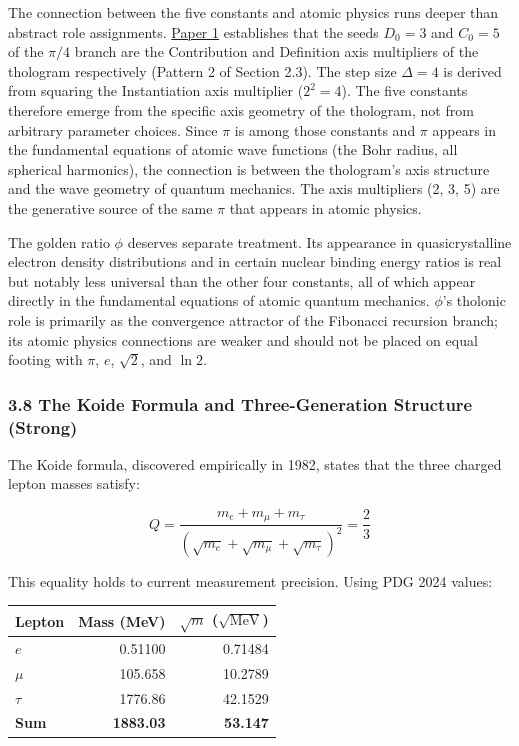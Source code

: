 \documentclass[
  11pt,
  letterpaper,
]{article}
\begin{document}
The connection between the five constants and atomic physics runs deeper
than abstract role assignments.
\href{https://github.com/baardev/truevalue/blob/main/docnav/Research/papers/1_recursive-tholonic-five-constants/1_recursive-tholonic-five-constants.pdf}{Paper
1} establishes that the seeds \(D_0 = 3\) and \(C_0 = 5\) of the
\(\pi/4\) branch are the Contribution and Definition axis multipliers of
the thologram respectively (Pattern 2 of Section 2.3). The step size
\(\Delta = 4\) is derived from squaring the Instantiation axis
multiplier (\(2^2 = 4\)). The five constants therefore emerge from the
specific axis geometry of the thologram, not from arbitrary parameter
choices. Since \(\pi\) is among those constants and \(\pi\) appears in
the fundamental equations of atomic wave functions (the Bohr radius, all
spherical harmonics), the connection is between the thologram's axis
structure and the wave geometry of quantum mechanics. The axis
multipliers (2, 3, 5) are the generative source of the same \(\pi\) that
appears in atomic physics.

The golden ratio \(\phi\) deserves separate treatment. Its appearance in
quasicrystalline electron density distributions and in certain nuclear
binding energy ratios is real but notably less universal than the other
four constants, all of which appear directly in the fundamental
equations of atomic quantum mechanics. \(\phi\)'s tholonic role is
primarily as the convergence attractor of the Fibonacci recursion
branch; its atomic physics connections are weaker and should not be
placed on equal footing with \(\pi\), \(e\), \(\sqrt{2}\), and
\(\ln 2\).

\subsubsection{3.8 The Koide Formula and Three-Generation Structure
(Strong)}\label{the-koide-formula-and-three-generation-structure-strong}

The Koide formula, discovered empirically in 1982, states that the three
charged lepton masses satisfy:

\[Q = \frac{m_e + m_\mu + m_\tau}{(\sqrt{m_e} + \sqrt{m_\mu} + \sqrt{m_\tau})^2} = \frac{2}{3}\]

This equality holds to current measurement precision. Using PDG 2024
values:

\begin{longtable}[]{@{}lrr@{}}
\toprule\noalign{}
Lepton & Mass (MeV) & \(\sqrt{m}\) (\(\sqrt{\text{MeV}}\)) \\
\midrule\noalign{}
\endhead
\bottomrule\noalign{}
\endlastfoot
\(e\) & 0.51100 & 0.71484 \\
\(\mu\) & 105.658 & 10.2789 \\
\(\tau\) & 1776.86 & 42.1529 \\
\textbf{Sum} & \textbf{1883.03} & \textbf{53.147} \\
\end{longtable}
\end{document}
